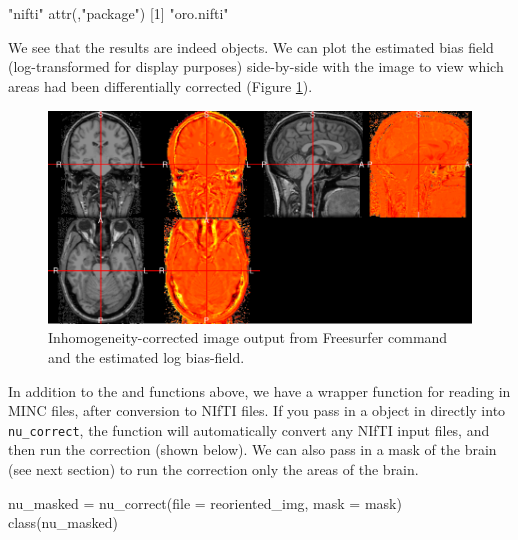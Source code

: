 \begin{Schunk}
\begin{Soutput}
[1] "nifti"
attr(,"package")
[1] "oro.nifti"
\end{Soutput}
\end{Schunk}

We see that the results are indeed  objects. We can plot the
estimated bias field (log-transformed for display purposes) side-by-side
with the image to view which areas had been differentially corrected
(Figure \ref{fig:nu_correct_plot}).

\begin{Schunk}
\begin{figure}
\includegraphics{muschelli_files/figure-latex/nu_correct_plot-1} \caption[Inhomogeneity-corrected image output from Freesurfer  command and the estimated log bias-field]{Inhomogeneity-corrected image output from Freesurfer  command and the estimated log bias-field.}\label{fig:nu_correct_plot}
\end{figure}
\end{Schunk}

In addition to the  and  functions above, we
have a  wrapper function for reading in MINC files, after
conversion to NIfTI files. If you pass in a  object in
directly into \texttt{nu\_correct}, the function will automatically
convert any NIfTI input files, and then run the correction (shown
below). We can also pass in a mask of the brain (see next section) to
run the correction only the areas of the brain.

\begin{Schunk}
\begin{Sinput}
nu_masked = nu_correct(file = reoriented_img, mask = mask)
class(nu_masked)
\end{Sinput}
\end{Schunk}

